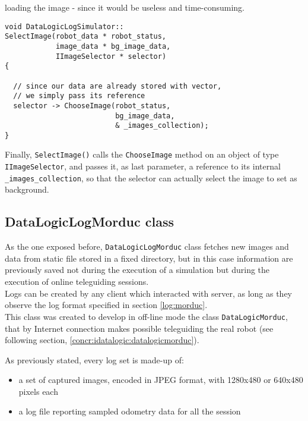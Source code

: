 loading the image - since it would be useless and time-consuming.
\\
\begin{lstlisting}[caption={\texttt{DataLogicLogSimulator::SelectImage()} method},
    label={code:datalogiclogsimulator:selectimage}]
void DataLogicLogSimulator::
SelectImage(robot_data * robot_status,
            image_data * bg_image_data,
            IImageSelector * selector)
{

  // since our data are already stored with vector,
  // we simply pass its reference
  selector -> ChooseImage(robot_status, 
                          bg_image_data, 
                          & _images_collection);
}
\end{lstlisting}

Finally, \texttt{SelectImage()} calls the \texttt{ChooseImage} method 
on an object of type \texttt{IImageSelector}, and passes it, as last 
parameter, a reference to its internal \texttt{\_images\_collection}, 
so that the selector can actually select the image to set as 
background.


\subsection{DataLogicLogMorduc class}
\label{concr:idatalogic:datalogiclogmorduc}

As the one exposed before, \texttt{DataLogicLogMorduc} class
fetches new images and data from static file
stored in a fixed directory, but in this case information are previously saved
not during the execution of a simulation but during
the execution of online teleguiding sessions.
\\
Logs can be created by any client which interacted with \morduc{}
server, as long as they observe the log format specified in section
\ref{log:morduc}.
\\
This class was created to develop in off-line mode the class
\texttt{DataLogicMorduc}, that by Internet connection makes possible
teleguiding the real robot (see following section,
\ref{concr:idatalogic:datalogicmorduc}).

As previously stated, every log set is made-up of:

\begin{itemize}
  \item a set of captured images, encoded in JPEG format,
    with 1280x480 or 640x480 pixels each
  \item a log file reporting sampled odometry data
    for all the session
\end{itemize}

